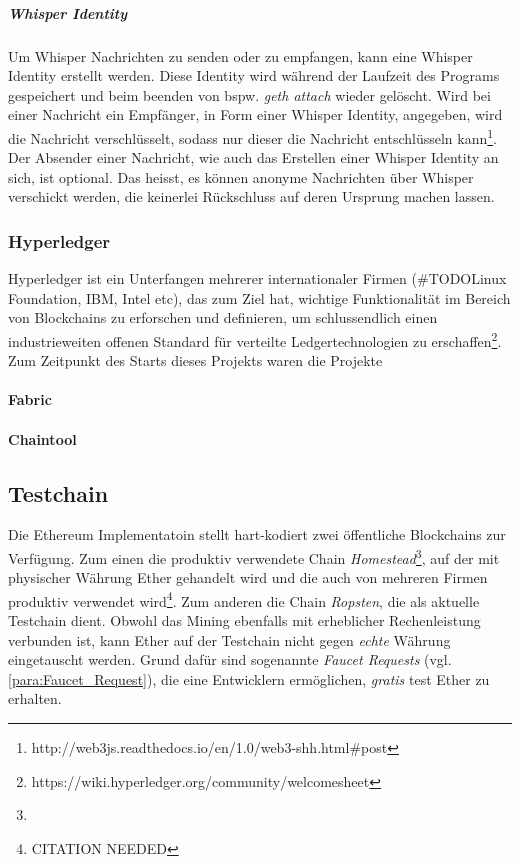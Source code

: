 \subparagraph{Whisper Identity}
\label{supara:Whisper_Identity}
Um Whisper Nachrichten zu senden oder zu empfangen, kann eine Whisper Identity erstellt werden. Diese Identity wird während der Laufzeit des Programs gespeichert und beim beenden von bspw. \emph{geth attach} wieder gelöscht. Wird bei einer Nachricht ein Empfänger, in Form einer Whisper Identity, angegeben, wird die Nachricht verschlüsselt, sodass nur dieser die Nachricht entschlüsseln kann\footnote{http://web3js.readthedocs.io/en/1.0/web3-shh.html#post}. Der Absender einer Nachricht, wie auch das Erstellen einer Whisper Identity an sich, ist optional. Das heisst, es können anonyme Nachrichten über Whisper verschickt werden, die keinerlei Rückschluss auf deren Ursprung machen lassen.

\subsubsection{Hyperledger}
Hyperledger ist ein Unterfangen mehrerer internationaler Firmen (\#TODOLinux Foundation, IBM, Intel etc), das zum Ziel hat, wichtige Funktionalität im Bereich von Blockchains zu erforschen und definieren, um schlussendlich einen industrieweiten offenen Standard für verteilte Ledgertechnologien zu erschaffen\footnote{https://wiki.hyperledger.org/community/welcomesheet}.
\\Zum Zeitpunkt des Starts dieses Projekts waren die Projekte 
\paragraph{Fabric}
\paragraph{Chaintool}

\subsection{Testchain}
Die Ethereum Implementatoin stellt hart-kodiert zwei öffentliche Blockchains zur Verfügung. Zum einen die produktiv verwendete Chain \emph{Homestead}\footnote{}, auf der mit physischer Währung Ether gehandelt wird und die auch von mehreren Firmen produktiv verwendet wird\footnote{CITATION NEEDED}. Zum anderen die Chain \emph{Ropsten}, die als aktuelle Testchain dient. Obwohl das Mining ebenfalls mit erheblicher Rechenleistung verbunden ist, kann Ether auf der Testchain nicht gegen \emph{echte} Währung eingetauscht werden. Grund dafür sind sogenannte \emph{Faucet Requests} (vgl. \ref{para:Faucet_Request}), die eine Entwicklern ermöglichen, \emph{gratis} test Ether zu erhalten.

